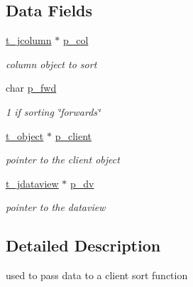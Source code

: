 \subsection*{Data Fields}
\begin{DoxyCompactItemize}
\item 
\hypertarget{structt__privatesortrec_a6356d03a10286e38271bdf69d7d6334c}{
\hyperlink{structt__jcolumn}{t\_\-jcolumn} $\ast$ \hyperlink{structt__privatesortrec_a6356d03a10286e38271bdf69d7d6334c}{p\_\-col}}
\label{structt__privatesortrec_a6356d03a10286e38271bdf69d7d6334c}

\begin{DoxyCompactList}\small\item\em column object to sort \item\end{DoxyCompactList}\item 
\hypertarget{structt__privatesortrec_a05b10d43aab697dc4cb6a8dff8b95832}{
char \hyperlink{structt__privatesortrec_a05b10d43aab697dc4cb6a8dff8b95832}{p\_\-fwd}}
\label{structt__privatesortrec_a05b10d43aab697dc4cb6a8dff8b95832}

\begin{DoxyCompactList}\small\item\em 1 if sorting \char`\"{}forwards\char`\"{} \item\end{DoxyCompactList}\item 
\hypertarget{structt__privatesortrec_a68fdc2decc7998942d28c472379e955b}{
\hyperlink{structt__object}{t\_\-object} $\ast$ \hyperlink{structt__privatesortrec_a68fdc2decc7998942d28c472379e955b}{p\_\-client}}
\label{structt__privatesortrec_a68fdc2decc7998942d28c472379e955b}

\begin{DoxyCompactList}\small\item\em pointer to the client object \item\end{DoxyCompactList}\item 
\hypertarget{structt__privatesortrec_a366316f1ee6618bb857803521a9bf542}{
\hyperlink{structt__jdataview}{t\_\-jdataview} $\ast$ \hyperlink{structt__privatesortrec_a366316f1ee6618bb857803521a9bf542}{p\_\-dv}}
\label{structt__privatesortrec_a366316f1ee6618bb857803521a9bf542}

\begin{DoxyCompactList}\small\item\em pointer to the dataview \item\end{DoxyCompactList}\end{DoxyCompactItemize}


\subsection{Detailed Description}
used to pass data to a client sort function 